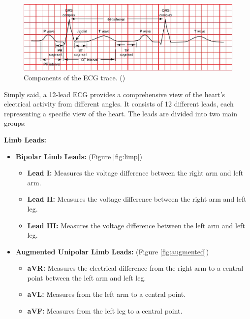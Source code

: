\documentclass{mldsmsc}
\begin{document}
\begin{figure}[h!]
\centering
\includegraphics[width=1\linewidth]{images/ecg-huszar.jpg}
\caption{Components of the ECG trace. (\cite{huszar})}
\label{fig:ecg-huszar}
\end{figure}

\noindent Simply said, a 12-lead ECG provides a comprehensive view of the heart's electrical activity from different angles. It consists of 12 different leads, each representing a specific view of the heart. The leads are divided into two main groups: \newline

\noindent \textbf{Limb Leads:}
\begin{itemize}
    \item \textbf{Bipolar Limb Leads:} (Figure \ref{fig:limp})
    \begin{itemize}
        \item \textbf{Lead I:} Measures the voltage difference between the right arm and left arm.
        \item \textbf{Lead II:} Measures the voltage difference between the right arm and left leg.
        \item \textbf{Lead III:} Measures the voltage difference between the left arm and left leg.
    \end{itemize}
    \item \textbf{Augmented Unipolar Limb Leads:} (Figure \ref{fig:augmented})
    \begin{itemize}
        \item \textbf{aVR:} Measures the electrical difference from the right arm to a central point between the left arm and left leg.
        \item \textbf{aVL:} Measures from the left arm to a central point.
        \item \textbf{aVF:} Measures from the left leg to a central point.
    \end{itemize}
\end{itemize}
\end{document}
